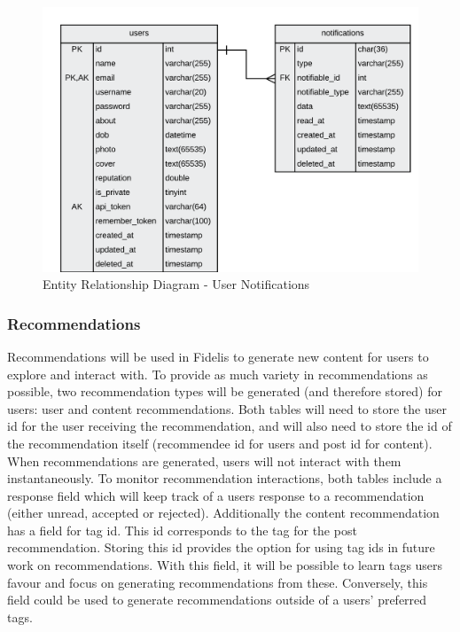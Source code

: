 \begin{figure}[H]
  \centering
  \includegraphics[width=1.0\textwidth]{Images/Design/Database/Notifications}
  \caption{Entity Relationship Diagram - User Notifications} \label{fig:ERD_Notifications}
\end{figure}

\subsubsection{Recommendations}
Recommendations will be used in Fidelis to generate new content for users to explore and interact with. To provide as much variety in recommendations as possible, two recommendation types will be generated (and therefore stored) for users: user and content recommendations. Both tables will need to store the user id for the user receiving the recommendation, and will also need to store the id of the recommendation itself (recommendee id for users and post id for content). When recommendations are generated, users will not interact with them instantaneously. To monitor recommendation interactions, both tables include a response field which will keep track of a users response to a recommendation (either unread, accepted or rejected). Additionally the content recommendation has a field for tag id. This id corresponds to the tag for the post recommendation. Storing this id provides the option for using tag ids in future work on recommendations. With this field, it will be possible to learn tags users favour and focus on generating recommendations from these. Conversely, this field could be used to generate recommendations outside of a users' preferred tags.

